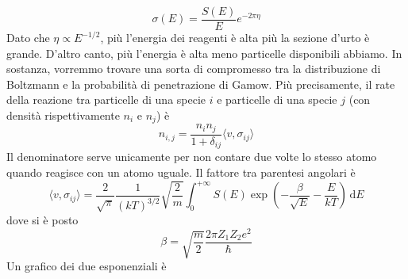 \documentclass[a4paper,11pt]{article}
\renewcommand{\d}{\mathrm{d}} %
\renewcommand{\d}{\,\mathrm{d}}
\theoremstyle{theorem}
\theoremstyle{definition}
\begin{document}
\begin{itemize}
		\[\sigma(E)=\frac{S(E)}{E}e^{-2\pi \eta}\]
		Dato che $\eta\propto E^{-1/2}$, più l'energia dei reagenti è alta più la sezione d'urto è grande. D'altro canto, più l'energia è alta meno particelle disponibili abbiamo. In sostanza, vorremmo trovare una sorta di compromesso tra la distribuzione di Boltzmann e la probabilità di penetrazione di Gamow. Più precisamente, il rate della reazione tra particelle di una specie $i$ e particelle di una specie $j$ (con densità rispettivamente $n_i$ e $n_j$) è
		\[n_{i,j}=\frac{n_in_j}{1+\delta_{ij}}\langle v,\sigma_{ij}\rangle\]
		Il denominatore serve unicamente per non contare due volte lo stesso atomo quando reagisce con un atomo uguale. Il fattore tra parentesi angolari è
		\[\langle v,\sigma_{ij}\rangle=\frac{2}{\sqrt{\pi}}\frac{1}{(kT)^{3/2}}\sqrt{\frac{2}{m}}\int_{0}^{+\infty}S(E)\exp\left(-\frac{\beta}{\sqrt{E}}-\frac{E}{kT}\right)\d E\]
		dove si è posto
		\[\beta=\sqrt{\frac{m}{2}}\frac{2\pi Z_1Z_2e^2}{\hbar}\]
		Un grafico dei due esponenziali è
		\begin{figure}[h]
			\centering
		\end{figure}
	

\end{itemize}
\end{document}
